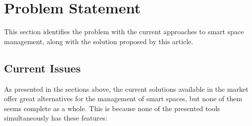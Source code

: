 \documentclass[runningheads]{llncs}
\begin{document}




\section{Problem Statement}

This section identifies the problem with the current approaches to smart space management, along with the solution proposed by this article.

\subsection{Current Issues}

As presented in the sections above, the current solutions available in the market offer great alternatives for the management of smart spaces, but none of them seems complete as a whole. This is because none of the presented tools simultaneously has these features:
\end{document}
